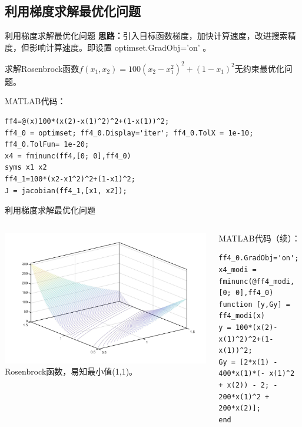 \documentclass[12pt]{beamer}
\begin{document}
	\subsection{利用梯度求解最优化问题}
\begin{frame}[fragile]{利用梯度求解最优化问题}
\textbf{思路：}引入目标函数梯度，加快计算速度，改进搜索精度，但影响计算速度。即设置 optimset.GradObj='on' 。
	
	\begin{example}[6-14]
求解Rosenbrock函数$f\left(x_{1}, x_{2}\right)=100\left(x_{2}-x_{1}^{2}\right)^{2}+\left(1-x_{1}\right)^{2}$无约束最优化问题。
	\end{example}
	
	\begin{block}{MATLAB代码：}
\begin{lstlisting}
ff4=@(x)100*(x(2)-x(1)^2)^2+(1-x(1))^2;
ff4_0 = optimset; ff4_0.Display='iter'; ff4_0.TolX = 1e-10; ff4_0.TolFun= 1e-20;
x4 = fminunc(ff4,[0; 0],ff4_0)
syms x1 x2
ff4_1=100*(x2-x1^2)^2+(1-x1)^2;
J = jacobian(ff4_1,[x1, x2]);
\end{lstlisting}
	\end{block}				
\end{frame}
\begin{frame}[fragile]{利用梯度求解最优化问题}
	\begin{columns}[T]
	\includegraphics[width=\textwidth]{24}
		Rosenbrock函数，易知最小值(1,1)。

\begin{block}{MATLAB代码（续）：}
\begin{lstlisting}
ff4_0.GradObj='on';
x4_modi = fminunc(@ff4_modi,[0; 0],ff4_0)
function [y,Gy] = ff4_modi(x)
y = 100*(x(2)-x(1)^2)^2+(1-x(1))^2;
Gy = [2*x(1) - 400*x(1)*(- x(1)^2 + x(2)) - 2; - 200*x(1)^2 + 200*x(2)];
end
\end{lstlisting}
\end{block}	
	\end{columns}

\end{frame}
\end{document}
